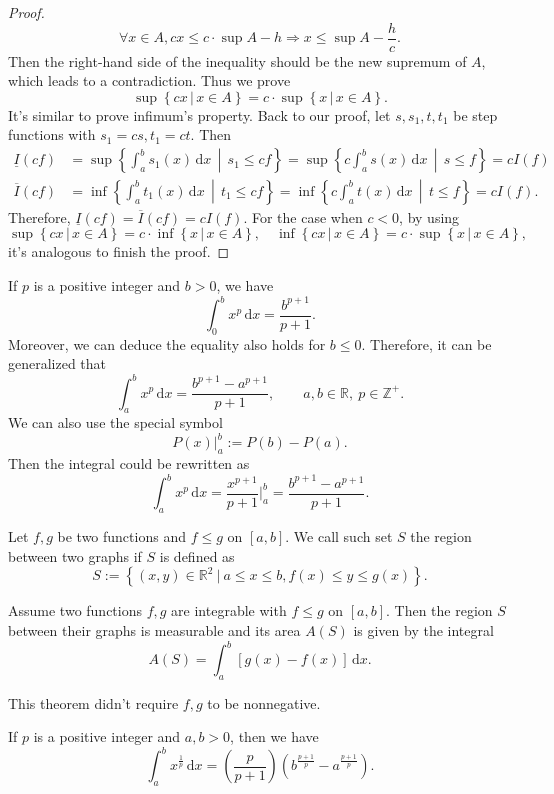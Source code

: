 \documentclass[a4paper]{ctexart}
\begin{document}
\begin{proof}
		\[
		\forall x\in A, cx \le c\cdot \sup A-h 
		\Rightarrow x \le \sup A-\frac{h}{c}.
		\]
		Then the right-hand side of the inequality should be the new supremum of $A$, which leads to a contradiction. Thus we prove
		\[
		\sup\left\{cx\,|\,x\in A \right\} = c\cdot\sup\left\{ x\,|\,x\in A\right\}.
		\]
		It's similar to prove infimum's property. Back to our proof, let $s,s_1,t,t_1$ be step functions with $s_1=cs,t_1=ct$. Then
		\[
		\begin{aligned}
			\underline{I}(cf) &= \sup \left\{ \int_a^b s_1(x) \, \mathrm{d}x \,\middle|\, s_1 \le cf \right\}
			=\sup \left\{ c\int_a^b s(x) \, \mathrm{d}x \,\middle|\, s \le f \right\}
			=cI(f)\\[6pt]
			\overline{I}(cf) &= \inf \left\{ \int_a^b t_1(x) \, \mathrm{d}x \,\middle|\, t_1 \le cf \right\}
			=\inf \left\{ c\int_a^b t(x) \, \mathrm{d}x \,\middle|\, t \le f \right\}
			=cI(f).
		\end{aligned}
		\]
		Therefore, $\underline{I}(cf)=\overline{I}(cf)=cI(f)$. For the case when $c<0$, by using
		\[
		\sup\left\{cx\,|\,x\in A \right\} = c\cdot\inf\left\{ x\,|\,x\in A\right\},
		\quad \inf \left\{cx\,|\,x\in A \right\} = c\cdot\sup \left\{ x\,|\,x\in A\right\},
		\]
		it's analogous to finish the proof.
	\end{proof}
	
	\begin{mythm}
		If $p$ is a positive integer and $b>0$, we have
		\[
		\int_0^b x^p \, \mathrm{d}x = \frac{b^{p+1}}{p + 1}.
		\]
		Moreover, we can deduce the equality also holds for $b\le 0$. Therefore, it can be generalized that
		\[
		\int_a^b x^p \, \mathrm{d}x = \frac{b^{p+1} - a^{p+1}}{p + 1},\qquad a,b\in \mathbb{R},\ p\in \mathbb{Z}^+.
		\]
		We can also use the special symbol
		\[
		P(x)\Big|_a^b :=P(b)-P(a).
		\]
		Then the integral could be rewritten as
		\[
		\int_a^b x^p \, \mathrm{d}x
		= \frac{x^{p+1}}{p + 1} \Big|_a^b
		= \frac{b^{p+1} - a^{p+1}}{p + 1}.
		\]
	\end{mythm}
	\begin{mydef}
		Let $f,g$ be two functions and $f\le g$ on $[a,b]$. We call such set $S$ the region between two graphs if $S$ is defined as
		\[
		S:=\left\{(x,y)\in \mathbb{R}^2\ |\ a\le x \le b,f(x)\le y\le g(x) \right\}.
		\]
	\end{mydef}
	\begin{mythm}
		Assume two functions $f,g$ are integrable with $f\le g$ on $[a,b]$. Then the region $S$ between their graphs is measurable and its area $A(S)$ is given by the integral
		\[
		A(S)=\int_a^b [g(x)-f(x)]\,\mathrm{d}x.
		\]
	\end{mythm}
	\begin{myrmk}
		This theorem didn't require $f,g$ to be nonnegative.
	\end{myrmk}
	\begin{mythm}
		 If $p$ is a positive integer and $a,b>0$, then we have
		 \[
		 \int_a^b x^{\frac{1}{p}} \, \mathrm{d}x = 
		 \left(\frac{p}{p+1} \right)\left(b^{\frac{p+1}{p}}- a^{\frac{p+1}{p}}\right).
		 \]
	\end{mythm}
	\newpage
\end{document}
